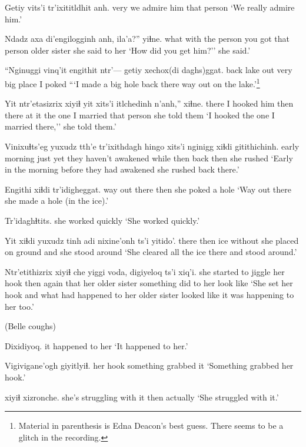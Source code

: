 \documentclass[12pt]{article}
\begin{document}
\gll Getiy {vits'i tr'ixititldhit} anh.
very  {we admire him} {that person}
\glt `We really admire him.'
\glend

\gll Ndadz axa di'engilogginh anh, ila'a?'' yiɬne.
what with {the person you got} {that person} {older sister} {she said to her}
\glt `How did you get him?'' she said.'
\glend

\gll ``Nginuggi vinq'it engithit ntr'--- getiy xechox(di daghs)ggat.
back    lake    out   {}  very  {big place} {I poked}
\glt ```I made a big hole back there way out on the lake.'\footnote{Material in parenthesis is Edna Deacon's best guess. There seems to be a glitch in the recording.}
\glend

\gll Yit ntr'etasizrix xiyiɬ yit xits'i itlchedinh n'anh,'' xiɬne.
there {I hooked him} then there {at it} {the one I married} {that person} {she told them}
\glt `I hooked the one I married there,'' she told them.'
\glend

\gll Vinixuɬts'eg yuxudz tth'e tr'ixithdagh hingo xits'i nginigg xiɬdi gitithichinh.
{early morning} just yet {they haven't awakened} while then back then {she rushed}
\glt `Early in the morning before they had awakened she rushed back there.'
\glend

\gll Engithi xiɬdi tr'idigheggat.
{way out there} then {she poked a hole}
\glt `Way out there she made a hole (in the ice).'
\glend

\gll Tr'idaghɬtits.
{{she worked quickly}}
\glt `She worked quickly.'
\glend

\gll Yit xiɬdi yuxudz tinh adi nixine'onh ts'i yitido'.
there then {} ice without {she placed on ground} and {she stood around}
\glt `She cleared all the ice there and stood around.'
\glend

\gll Ntr'etithizrix xiyiɬ che yiggi voda, digiyeloq ts'i xiq'i.
{she started to jiggle her hook} then again that {her older sister} {something did to her} {} {look like}
\glt `She set her hook and what had happened to her older sister looked like it was happening to her too.'
\glend

(Belle coughs)

\gll Dixidiyoq.
{{it happened to her}}
\glt `It happened to her.'
\glend

\gll Vigivigane'ogh giyitlyiɬ.
{her hook} {something grabbed it}
\glt `Something grabbed her hook.'
\glend

 xiyiɬ xizronche.
{she's struggling with it}  then actually
\glt `She struggled with it.'
\glend
\end{document}
